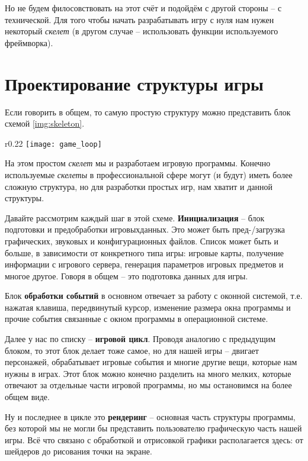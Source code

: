 Но не будем филосовствовать на этот счёт и подойдём с другой стороны -- с технической. Для того чтобы начать
разрабатывать игру с нуля нам нужен некоторый \emph{скелет} (в другом случае -- использовать функции 
используемого фреймворка).

\section{Проектирование структуры игры}

Если говорить в общем, то самую простую структуру можно представить блок схемой \ref{img:skeleton}.
\begin{wrapfigure}[18]{r}{0.22\linewidth}
    \texttt{[image: game\_loop]}
    \caption{Структура игрового цикла}
    \label{img:skeleton}
\end{wrapfigure}

На этом простом \emph{скелет} мы и разработаем игровую программы. Конечно используемые \emph{скелеты} в 
профессиональной сфере могут (и будут) иметь более сложную структура, но для разработки простых игр, нам 
хватит и данной структуры.

Давайте рассмотрим каждый шаг в этой схеме. \textbf{Инициализация} -- блок подготовки и предобработки 
игровыхданных. Это может быть пред-/загрузка графических, звуковых и конфигурационных файлов. Список может 
быть и больше, в зависимости от конкретного типа игры: игровые карты, получение информации с игрового 
сервера, генерация параметров игровых предметов и многое другое. Говоря в общем -- это подготовка данных 
для игры.

Блок \textbf{обработки событий} в основном отвечает за работу с оконной системой, т.е. нажатая клавиша, 
передвинутый курсор, изменение размера окна программы и прочие события связанные с окном программы в 
операционной системе. 

Далее у нас по списку -- \textbf{игровой цикл}. Проводя аналогию с предыдущим блоком, то этот блок делает 
тоже самое, но для нашей игры -- двигает персонажей, обрабатывает игровые события и многие другие вещи, 
которые нам нужны в играх. Этот блок можно конечно разделить на много мелких, которые отвечают за 
отдельные части игровой программы, но мы остановимся на более общем виде. 

Ну и последнее в цикле это \textbf{рендеринг} -- основная часть структуры программы, без которой мы не могли 
бы представить пользователю графическую часть нашей игры. Всё что связано с обработкой и отрисовкой графики 
располагается здесь: от шейдеров до рисования точки на экране.

